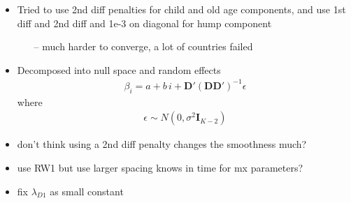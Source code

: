 \documentclass[12pt,a4paper]{article}
\date{\vspace{-5ex}}
\begin{document}
\begin{itemize}
\item Tried to use 2nd diff penalties for child and old age components, and use 1st diff and 2nd diff and 1e-3 on diagonal for hump component
	\begin{itemize}
	\item[--] much harder to converge, a lot of countries failed 
	\end{itemize}
\item Decomposed into null space and random effects
\begin{align*}
\beta_i = a + b \, i + \boldsymbol{D}'(\boldsymbol{D}\boldsymbol{D}')^{-1} \epsilon
\end{align*}
where
\begin{align*}
\epsilon \sim N(0, \sigma ^2 \boldsymbol{I}_{K-2})
\end{align*}
\item don't think using a 2nd diff penalty changes the smoothness much?
\item use RW1 but use larger spacing knows in time for mx parameters?
\item fix $\lambda_{D1}$ as small constant
\end{itemize}
\end{document}

